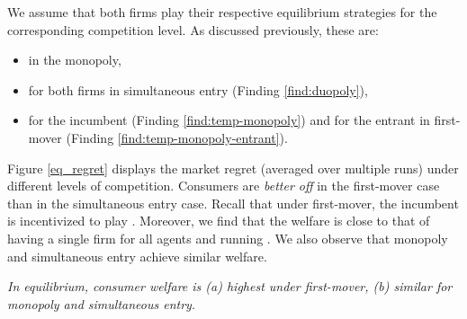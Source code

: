 \documentclass[../competing_bandits_with_appendix.tex]{subfiles}
\begin{document}
We assume that both firms play their respective equilibrium strategies for the corresponding competition level. As discussed previously, these are:
\begin{itemize}
\item \DG in the monopoly,
\item \DG for both firms in simultaneous entry (Finding \ref{find:duopoly}),
\item \TS for the incumbent (Finding \ref{find:temp-monopoly}) and \DG for the entrant in first-mover (Finding \ref{find:temp-monopoly-entrant}).
\end{itemize}

Figure \ref{eq_regret} displays the market regret (averaged
  over multiple runs) under different levels of competition.
Consumers are \textit{better off} in the first-mover case than in
the simultaneous entry case. Recall that under first-mover, the incumbent is incentivized to play \TS. Moreover, we find that the welfare is close to that of having a single firm for all agents and running \TS. We also observe that monopoly and simultaneous entry achieve similar welfare.

\begin{finding}\label{find:welfare}
\textit{In equilibrium, consumer welfare is (a) highest under first-mover, (b) similar for monopoly and simultaneous entry.
}
\end{finding}
\end{document}
